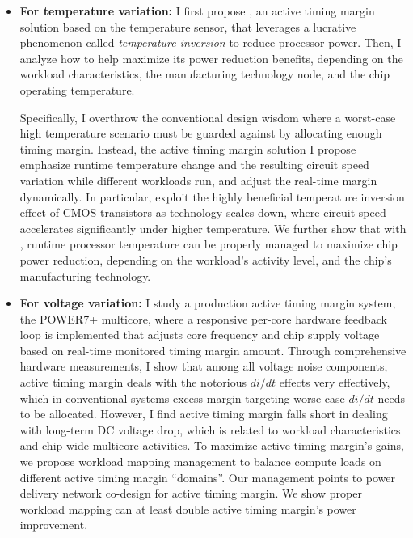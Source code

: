 \begin{itemize}

\item \textbf{For temperature variation:} I first propose \tistates, an active timing margin solution based on the temperature sensor, that leverages a lucrative phenomenon called \textit{temperature inversion} to reduce processor power. Then, I analyze how to help \tistates maximize its power reduction benefits, depending on the workload characteristics, the manufacturing technology node, and the chip operating temperature.

Specifically, I overthrow the conventional design wisdom where a worst-case high temperature scenario must be guarded against by allocating enough timing margin. Instead, the \tistates active timing margin solution I propose emphasize runtime temperature change and the resulting circuit speed variation while different workloads run, and adjust the real-time margin dynamically. In particular, \tistates exploit the highly beneficial temperature inversion effect of CMOS transistors as technology scales down, where circuit speed accelerates significantly under higher temperature. We further show that with \tistates, runtime processor temperature can be properly managed to maximize chip power reduction, depending on the workload's activity level, and the chip's manufacturing technology.


\item \textbf{For voltage variation:}  I study a production active timing margin system, the POWER7+ multicore, where a responsive per-core hardware feedback loop is implemented that adjusts core frequency and chip supply voltage based on real-time monitored timing margin amount. Through comprehensive hardware measurements, I show that among all voltage noise components, active timing margin deals with the notorious $di/dt$ effects very effectively, which in conventional systems excess margin targeting worse-case $di/dt$ needs to be allocated. However, I find active timing margin falls short in dealing with long-term DC voltage drop, which is related to workload characteristics and chip-wide multicore activities. To maximize active timing margin's gains, we propose workload mapping management to balance compute loads on different active timing margin ``domains''. Our management points to power delivery network co-design for active timing margin. We show proper workload mapping can at least double active timing margin's power improvement.


\end{itemize}
